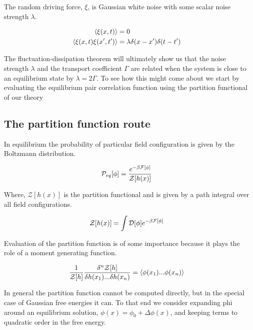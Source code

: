 The random driving force, $\xi$, is Gaussian white noise with some scalar noise strength $\lambda$.

\begin{align}
\left\langle \xi (x, t) \right\rangle &= 0 \\
\left\langle \xi (x, t) \xi(x^\prime, t^\prime) \right\rangle  &= \lambda \delta(x - x^\prime) \delta (t - t^\prime)
\end{align}

The fluctuation-dissipation theorem will ultimately show us that the noise strength $\lambda$ and the transport coefficient $\Gamma$ are related when the system is close to an equilibrium state by $\lambda = 2\Gamma$. To see how this might come about we start by evaluating the equilibrium pair correlation function using the partition functional of our theory

\subsection{The partition function route}

In equilibrium the probability of particular field configuration is given by the Boltzmann distribution.

\begin{equation}
\mathcal{P}_{eq}[\phi] = \frac{e^{-\beta\mathcal{F}[\phi]}}{\mathcal{Z}[h(x)]}
\end{equation}

Where, $\mathcal{Z}[h(x)]$ is the partition functional and is given by a path integral over all field configurations.

\begin{equation}
\mathcal{Z}[h(x)] = \int \mathcal{D}[\phi] e^{-\beta\mathcal{F}[\phi]}
\end{equation}

Evaluation of the partition function is of some importance because it plays the role of a moment generating function.

\begin{equation}\label{gen}
\frac{1}{\mathcal{Z}[h]}\frac{\delta^n \mathcal{Z}[h]}{\delta h(x_1)...\delta h(x_n)} = \langle \phi(x_1)...\phi(x_n)\rangle
\end{equation}

In general the partition function cannot be computed directly, but in the special case of Gaussian free energies it can. To that end we consider expanding phi around an equilibrium solution, $\phi(x) = \phi_0 + \Delta\phi(x)$, and keeping terms to quadratic order in the free energy.

